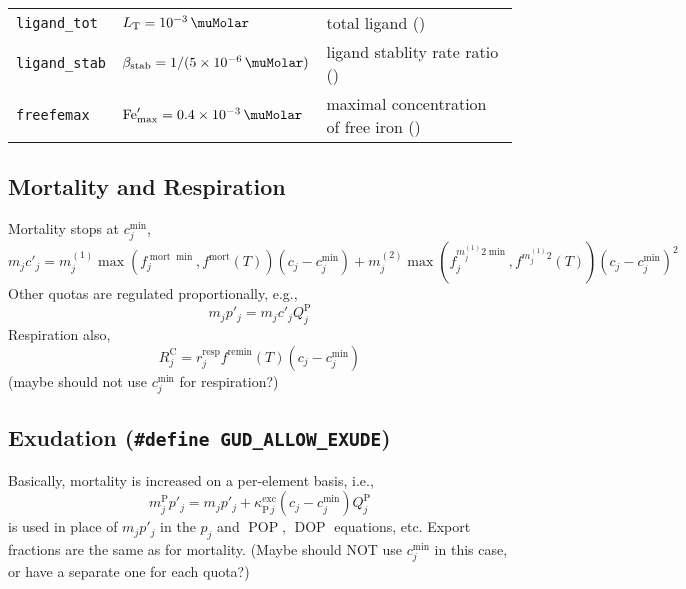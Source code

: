 \documentclass[11pt,letterpaper,english]{article}
\renewcommand{\ll}[1]{{\tt #1}}
\def\|#1|{\operatorname{#1}}
\def\mort{m^{(1)}_j}
\DeclareMathOperator{\Fe}{Fe}
\DeclareMathOperator{\DOP}{DOP}
\DeclareMathOperator{\POP}{POP}
\newcommand{\C}{\mathrm{C}}
\renewcommand{\P}{\mathrm{P}}
\let\unit=\si
\renewcommand{\si}{\mathrm{si}}
\newcommand{\total}{{\mathrm{T}}}
\newcommand{\FeT}{\Fe_\total}
\newcommand{\Ltot}{L_\total}
\newcommand{\stab}{\text{stab}}
\newcommand{\Lstab}{\beta_{\stab}}
\newcommand{\resp}{{\text{resp}}}
\newcommand{\scav}{{\text{scav}}}
\newcommand{\remin}{{\text{remin}}}
\newcommand{\X}{c}
\begin{document}

%

\begin{tabular}{@{}l@{\qquad}l@{${}={}$}l}
\ll{ligand\_tot}  & $\Ltot=\SI{e-3}{\muMolar}$
                  & total ligand (\unit{\muMolar})  \\
\ll{ligand\_stab} & $\Lstab=1/(\SI{5E-6}{\muMolar})$
                  & ligand stablity rate ratio (\unit{\meter\cubed\per\milli\mol}) \\
\ll{freefemax}    & $\Fe'_{\max}=\SI{0.4E-3}{\muMolar}$
                  & maximal concentration of free iron (\unit{\milli\mol\per\meter\cubed})
\end{tabular}






\subsection{Mortality and Respiration}

Mortality stops at $\X_j^{\min}$,
\[
  m_j c'_j = m^{(1)}_j \max\left(f^{\|mort|\min}_j, f^{\|mort|}(T)\right) (\X_j - \X_j^{\min})
      + m^{(2)}_j \max\left(f^{\mort2\min}_j, f^{\mort2}(T)\right) (\X_j - \X_j^{\min})^2
\]
Other quotas are regulated proportionally, e.g.,
\[
  m_j p'_j = m_j c'_j Q^\P_j
\]
Respiration also,
\[
  R^\C_j = r^\resp_j f^\remin(T) (\X_j - \X_j^{\min})
\]
(maybe should not use $\X_j^{\min}$ for respiration?)



\subsection{Exudation ({\tt \#define GUD\_ALLOW\_EXUDE})}

Basically, mortality is increased on a per-element basis, i.e.,
\[
  m_j^{\P} p'_j = m_j p'_j + \kappa^{\|exc|}_{\P\,j} (\X_j - \X_j^{\min}) Q^\P_j
\]
is used in place of $m_j p'_j$ in the $p_j$ and $\POP$, $\DOP$ equations, etc.
Export fractions are the same as for mortality.
(Maybe should NOT use $\X_j^{\min}$ in this case, or have a separate one for each quota?)
\end{document}
